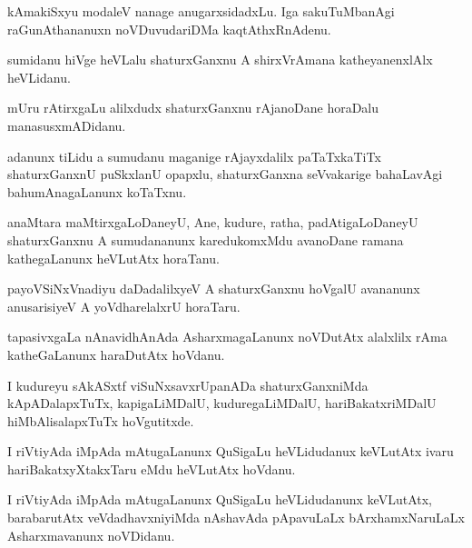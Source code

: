 \documentclass{article}
\begin{document}
\begin{mn}%
kAmakiSxyu modaleV nanage anugarxsidadxLu. Iga sakuTuMbanAgi raGunAthananuxn 
noVDuvudariDMa kaqtAthxRnAdenu.
\end{mn}

\begin{mn}%
sumidanu hiVge heVLalu shaturxGanxnu A shirxVrAmana katheyanenxlAlx heVLidanu.
\end{mn}

\begin{mn}%
mUru rAtirxgaLu alilxdudx shaturxGanxnu rAjanoDane horaDalu manasusxmADidanu.
\end{mn}

\begin{mn}%
adanunx tiLidu a sumudanu maganige rAjayxdalilx paTaTxkaTiTx shaturxGanxnU puSkxlanU opapxlu,
shaturxGanxna seVvakarige bahaLavAgi bahumAnagaLanunx koTaTxnu.
\end{mn}

\begin{mn}%
anaMtara maMtirxgaLoDaneyU, Ane, kudure, ratha, padAtigaLoDaneyU shaturxGanxnu A 
sumudananunx karedukomxMdu avanoDane ramana kathegaLanunx heVLutAtx horaTanu.
\end{mn}

\begin{mn}%
payoVSiNxVnadiyu daDadalilxyeV A shaturxGanxnu hoVgalU avananunx anusarisiyeV A 
yoVdharelalxrU horaTaru.
\end{mn}

\begin{mn}%
tapasivxgaLa nAnavidhAnAda AsharxmagaLanunx noVDutAtx alalxlilx rAma katheGaLanunx 
haraDutAtx hoVdanu.
\end{mn}

\begin{mn}%
I kudureyu sAkASxtf viSuNxsavxrUpanADa shaturxGanxniMda kApADalapxTuTx, kapigaLiMDalU, 
kuduregaLiMDalU, hariBakatxriMDalU hiMbAlisalapxTuTx hoVgutitxde.
\end{mn}

\begin{mn}%
I riVtiyAda iMpAda mAtugaLanunx QuSigaLu heVLidudanux keVLutAtx ivaru hariBakatxyXtakxTaru 
eMdu heVLutAtx hoVdanu.
\end{mn}

\begin{mn}%
I riVtiyAda iMpAda mAtugaLanunx QuSigaLu heVLidudanunx keVLutAtx, barabarutAtx 
veVdadhavxniyiMda nAshavAda pApavuLaLx bArxhamxNaruLaLx Asharxmavanunx noVDidanu.
\end{mn}
\end{document}
